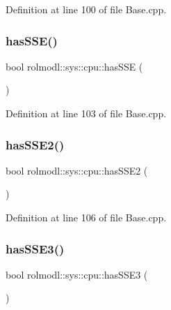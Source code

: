 Definition at line 100 of file Base.\+cpp.

\mbox{\label{namespacerolmodl_1_1sys_1_1cpu_a4486fdd3d0f3e4a8e7be04a630bcb244}} 
\subsubsection{\texorpdfstring{hasSSE()}{hasSSE()}}
{\footnotesize\ttfamily bool rolmodl\+::sys\+::cpu\+::has\+S\+SE (\begin{DoxyParamCaption}{ }\end{DoxyParamCaption})\hspace{0.3cm}{\ttfamily [noexcept]}}



Definition at line 103 of file Base.\+cpp.

\mbox{\label{namespacerolmodl_1_1sys_1_1cpu_a9924bd370ff28059cce71ae90ac116fd}} 
\subsubsection{\texorpdfstring{hasSSE2()}{hasSSE2()}}
{\footnotesize\ttfamily bool rolmodl\+::sys\+::cpu\+::has\+S\+S\+E2 (\begin{DoxyParamCaption}{ }\end{DoxyParamCaption})\hspace{0.3cm}{\ttfamily [noexcept]}}



Definition at line 106 of file Base.\+cpp.

\mbox{\label{namespacerolmodl_1_1sys_1_1cpu_a8c1b85a95b0e010ed12e98385e66daa4}} 
\subsubsection{\texorpdfstring{hasSSE3()}{hasSSE3()}}
{\footnotesize\ttfamily bool rolmodl\+::sys\+::cpu\+::has\+S\+S\+E3 (\begin{DoxyParamCaption}{ }\end{DoxyParamCaption})\hspace{0.3cm}{\ttfamily [noexcept]}}



